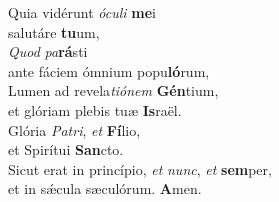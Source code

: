 \evenverse Quia vidérunt \textit{ó}\textit{cu}\textit{li} \textbf{me}i~\*\\
\evenverse salutáre \textbf{tu}um,\\
\oddverse \textit{Quod} \textit{pa}\textbf{rá}sti~\*\\
\oddverse ante fáciem ómnium popu\textbf{ló}rum,\\
\evenverse Lumen ad revela\textit{ti}\textit{ó}\textit{nem} \textbf{Gén}tium,~\*\\
\evenverse et glóriam plebis tuæ \textbf{Is}raël.\\
\oddverse Glória \textit{Pa}\textit{tri}, \textit{et} \textbf{Fí}lio,~\*\\
\oddverse et Spirítui \textbf{San}cto.\\
\evenverse Sicut erat in princípio, \textit{et} \textit{nunc}, \textit{et} \textbf{sem}per,~\*\\
\evenverse et in sǽcula sæculórum. \textbf{A}men.\\
